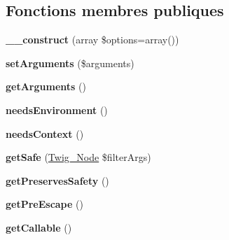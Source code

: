 \subsection*{Fonctions membres publiques}
\begin{DoxyCompactItemize}
\item 
{\bfseries \+\_\+\+\_\+construct} (array \$options=array())\hypertarget{class_twig___filter_a2d2b2afcd896367c740d1eb4b486614b}{}\label{class_twig___filter_a2d2b2afcd896367c740d1eb4b486614b}

\item 
{\bfseries set\+Arguments} (\$arguments)\hypertarget{class_twig___filter_a2b7df0e0f61ee886144db2d59fc0d7da}{}\label{class_twig___filter_a2b7df0e0f61ee886144db2d59fc0d7da}

\item 
{\bfseries get\+Arguments} ()\hypertarget{class_twig___filter_a1d4c324c5a088be98d99d3efbf3502e1}{}\label{class_twig___filter_a1d4c324c5a088be98d99d3efbf3502e1}

\item 
{\bfseries needs\+Environment} ()\hypertarget{class_twig___filter_a711311882c7dd1058f92f7eb0e8edeeb}{}\label{class_twig___filter_a711311882c7dd1058f92f7eb0e8edeeb}

\item 
{\bfseries needs\+Context} ()\hypertarget{class_twig___filter_a52c35bc6da8861f40aa59f1b99f7ef0f}{}\label{class_twig___filter_a52c35bc6da8861f40aa59f1b99f7ef0f}

\item 
{\bfseries get\+Safe} (\hyperlink{class_twig___node}{Twig\+\_\+\+Node} \$filter\+Args)\hypertarget{class_twig___filter_acc5701ec146ba15919020bbc42941632}{}\label{class_twig___filter_acc5701ec146ba15919020bbc42941632}

\item 
{\bfseries get\+Preserves\+Safety} ()\hypertarget{class_twig___filter_a7fc1becef9ade703f0c381e579d5a879}{}\label{class_twig___filter_a7fc1becef9ade703f0c381e579d5a879}

\item 
{\bfseries get\+Pre\+Escape} ()\hypertarget{class_twig___filter_a4b7863ed7e994206f25a6c84cbc59116}{}\label{class_twig___filter_a4b7863ed7e994206f25a6c84cbc59116}

\item 
{\bfseries get\+Callable} ()\hypertarget{class_twig___filter_a0be839e0782a38a172c386bd963375c9}{}\label{class_twig___filter_a0be839e0782a38a172c386bd963375c9}

\end{DoxyCompactItemize}
